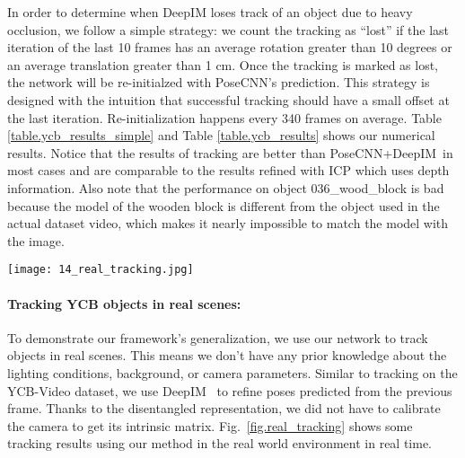 \documentclass[twocolumn]{svjour3}
\newcommand{\dimnet}[0]{DeepIM}
\begin{document}
In order to determine when DeepIM loses track of an object due to heavy occlusion, we follow a simple strategy: we count the tracking as ``lost'' if the last iteration of the last 10 frames has an average rotation greater than 10 degrees or an average translation greater than 1 cm. Once the tracking is marked as lost, the network will be re-initialzed with PoseCNN's prediction. This strategy is designed with the intuition that  successful
tracking should have a small offset at the last iteration.
Re-initialization happens every 340 frames on average. Table \ref{table.ycb_results_simple} and Table \ref{table.ycb_results} shows our numerical results. Notice that the results of tracking are better than PoseCNN+\dimnet~in most cases and are comparable to the results refined with ICP which uses depth information. Also note that the performance on object 036\_wood\_block is bad because the model of the wooden block is different from the object used in the actual dataset video, which makes it nearly impossible to match the model with the image. 
\begin{figure*}[t]
	\centering
	\texttt{[image: 14\_real\_tracking.jpg]}
\caption{Examples on tracking in the real world, using the same network as in Table.~\ref{table.ycb_results} and no prior knowledge about focal length.  The first row shows the images captured with a webcam and the second row renders the object onto the image based on the estimated pose.}
\label{fig.real_tracking}
\end{figure*}
\paragraph{Tracking YCB objects in real scenes:} To demonstrate our framework's generalization, we use our network to track objects in real scenes. This means we don't have any prior knowledge about the
lighting conditions, background, or camera parameters. Similar to tracking on the YCB-Video dataset, we use \dimnet~ to refine poses predicted from the
previous frame. Thanks to the disentangled representation, we did not have to calibrate the camera to get its intrinsic matrix. Fig.~\ref{fig.real_tracking} shows some tracking results using our method in the real world environment in real time. 
\end{document}
